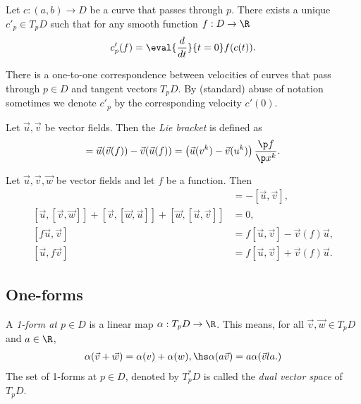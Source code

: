 \documentclass{article}
\begin{document}
\begin{proposition}[Notes 4.9]
	Let $c:(a,b)\to D$ be a curve that passes through $p$. There exists a unique
	$c'_p\in T_p D$ such that for any smooth function $f:D\to\R$
	\begin{align*}
		c'_p(f) = \eval{\frac{d}{dt}}{t=0} f(c(t)).
	\end{align*}
\end{proposition}

\begin{corollary}
	There is a one-to-one correspondence between velocities of curves that pass through
	$p\in D$ and tangent vectors $T_pD$. By (standard) abuse of notation sometimes
	we denote $c'_p$ by the corresponding velocity $c'(0)$.
\end{corollary}

\begin{definition}
	Let $\vec u,\vec v$ be vector fields. Then the \emph{Lie bracket} is defined as
	\begin{align*}
		[\vec u, \vec v] = \vec u(\vec v(f)) - \vec v(\vec u(f))
		= \left(\vec u(v^k)-\vec v(u^k)\right)\frac{\p f}{\p x^k}.
	\end{align*}
\end{definition}

\begin{lemma}
	Let $\vec u, \vec v, \vec w$ be vector fields and let $f$ be a
	function. Then
	\begin{align*}
		[\vec v, \vec u]                                                                     & = -[\vec u, \vec v],                \\
		[\vec u, [\vec v, \vec w]] + [\vec v, [\vec w, \vec u]] + [\vec w, [\vec u, \vec v]] & = 0,                                \\
		[f\vec u, \vec v]                                                                    & = f[\vec u,\vec v]-\vec v(f)\vec u, \\
		[\vec u, f\vec v]                                                                    & = f[\vec u,\vec v]+\vec v(f)\vec u.
	\end{align*}
\end{lemma}

\subsection{One-forms}

\begin{definition}
	A \emph{1-form at $p\in D$} is a linear map $\alpha:T_pD \to \R$. This means, for all
	$\vec v, \vec w\in T_pD$ and $a\in\R$,
	\begin{align*}
		\alpha(\vec v + \vec w) = \alpha(v) + \alpha(w),\hs \alpha(a\vec v) = a\alpha(\vec v    la.)
	\end{align*}
	The set of 1-forms at $p\in D$, denoted by $T^*_p D$ is called the \emph{dual vector space}
	of $T_p D$.
\end{definition}
\end{document}
